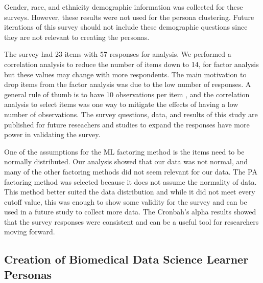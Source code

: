 \documentclass[020-persona\_validation.tex]{subfiles}
\begin{document}
        Gender, race, and ethnicity demographic information was collected for these surveys.
        However, these results were not used for the persona clustering.
        Future iterations of this survey should not include these
        demographic questions since they are not relevant to creating the personas.

        The survey had 23 items with 57 responses for analysis.
        We performed a correlation analysis to reduce the number of items down to 14, for factor analysis
        but these values may change with more respondents.
        The main motivation to drop items from the factor analysis was due to the low number of responses.
        A general rule of thumb is to have 10 observations per item
        \cite{kyriazosAppliedPsychometricsSample2018, wolfSampleSizeRequirements2013, mundfromMinimumSampleSize2005},
        and the correlation analysis to select items was one way to mitigate the effects of having a low number of observations.
        The survey questions, data, and results of this study are published for future reseachers and studies
        to expand the responses have more power in validating the survey.

        One of the assumptions for the ML factoring method is the items need to be normally distributed.
        Our analysis showed that our data was not normal,
        and many of the other factoring methods did not seem relevant for our data.
        The PA factoring method was selected because it does not assume the normality of data.
        This method better suited the data distribution and
        while it did not meet every cutoff value,
        this was enough to show some validity for the survey
        and can be used in a future study to collect more data.
        The Cronbah's alpha results showed that the survey responses were consistent and
        can be a useful tool for researchers moving forward.

    \subsection{Creation of Biomedical Data Science Learner Personas}
\end{document}
